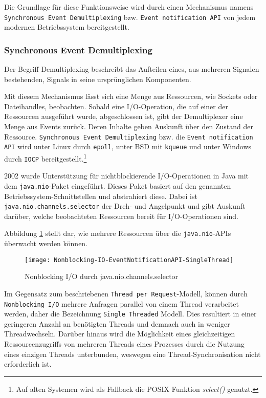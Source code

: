Die Grundlage für diese Funktionsweise wird durch einen Mechanismus namens \verb|Synchronous Event Demultiplexing|
bzw. \verb|Event notification API| von jedem modernen Betriebssystem bereitgestellt.

\subsubsection{Synchronous Event Demultiplexing}
\label{subsubsec:event demultiplexing}
Der Begriff Demultiplexing beschreibt das Aufteilen eines, aus mehreren Signalen bestehenden, Signals
in seine ursprünglichen Komponenten.

Mit diesem Mechanismus lässt sich eine Menge aus Ressourcen, wie Sockets oder Dateihandles, beobachten.
Sobald eine I/O-Operation, die auf einer der Ressourcen ausgeführt wurde, abgeschlossen ist, gibt der Demultiplexer eine Menge aus Events
zurück. Deren Inhalte geben Auskunft über den Zustand der Ressource.
\verb|Synchronous Event Demultiplexing| bzw. die \verb|Event notification API| wird unter Linux durch \verb|epoll|, unter BSD mit
\verb|kqueue| und unter
Windows durch \verb|IOCP| bereitgestellt.\footnote{Auf alten Systemen wird als Fallback die POSIX Funktion \textit{select()} genutzt.}

2002 wurde Unterstützung für nichtblockierende I/O-Operationen in Java mit dem \verb|java.nio|-Paket eingeführt.
Dieses Paket basiert auf den genannten Betriebssystem-Schnittstellen und abstrahiert diese.\parencite{OpenJDKNIO}
Dabei ist \verb|java.nio.channels.selector| der Dreh- und Angelpunkt und gibt Auskunft darüber, welche
beobachteten Ressourcen bereit für I/O-Operationen sind.

Abbildung \ref{fig:nonblocking_single_thread} stellt dar, wie mehrere Ressourcen über die
\verb|java.nio|-APIs überwacht werden können.

\begin{figure}[ht!]
  \centering
  \texttt{[image: Nonblocking-IO-EventNotificationAPI-SingleThread]}
  \caption{Nonblocking I/O durch java.nio.channels.selector \parencite{NettyInAction}}
  \label{fig:nonblocking_single_thread}
\end{figure}

Im Gegensatz zum beschriebenen \verb|Thread per Request|-Modell, können durch \newline\verb|Nonblocking I/O|
mehrere Anfragen parallel von einem Thread verarbeitet werden, daher die Bezeichnung \verb|Single Threaded| Modell.
Dies resultiert in einer geringeren Anzahl an benötigten Threads und demnach auch in weniger Threadwechseln.
Darüber hinaus wird die Möglichkeit eines gleichzeitigen Ressourcenzugriffs von mehreren Threads eines Prozesses
durch die Nutzung eines einzigen Threads unterbunden, weswegen eine Thread-Synchronisation nicht erforderlich ist.

